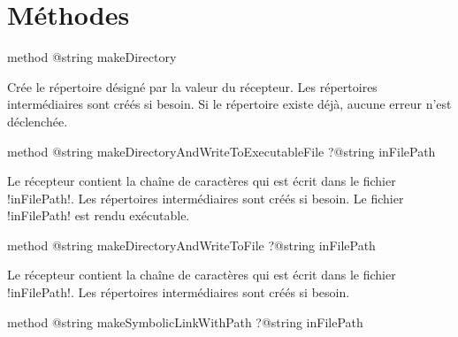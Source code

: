 \section{Méthodes}






\begin{galgasbox}
method @string makeDirectory
\end{galgasbox}

Crée le répertoire désigné par la valeur du récepteur. Les répertoires intermédiaires sont créés si besoin. Si le répertoire existe déjà, aucune erreur n'est déclenchée.







\begin{galgasbox}
method @string makeDirectoryAndWriteToExecutableFile ?@string inFilePath
\end{galgasbox}

Le récepteur contient la chaîne de caractères qui est écrit dans le fichier \ggs!inFilePath!. Les répertoires intermédiaires sont créés si besoin. Le fichier \ggs!inFilePath! est rendu exécutable.








\begin{galgasbox}
method @string makeDirectoryAndWriteToFile ?@string inFilePath
\end{galgasbox}

Le récepteur contient la chaîne de caractères qui est écrit dans le fichier \ggs!inFilePath!. Les répertoires intermédiaires sont créés si besoin.









\begin{galgasbox}
method @string makeSymbolicLinkWithPath ?@string inFilePath
\end{galgasbox}









